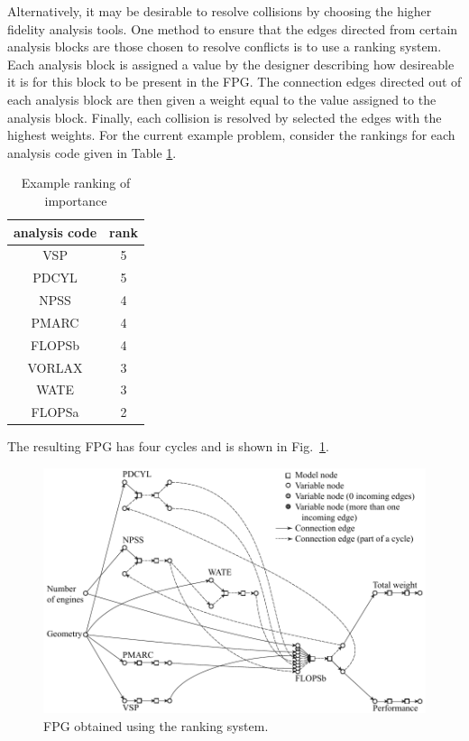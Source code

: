 	Alternatively, it may be desirable to resolve collisions by choosing the higher fidelity analysis tools.
	One method to ensure that the edges directed from certain analysis blocks are those chosen to resolve conflicts is to use a ranking system. Each analysis block is assigned a value by the designer describing how desireable it is for this block to be present in the FPG. The connection edges directed out of each analysis block are then given a weight equal to the value assigned to the analysis block. Finally, each collision is resolved by selected the edges with the highest weights.
For the current example problem, consider the rankings for each analysis code given in Table \ref{t:rankings}.
	\begin{table}[htbp]
	  \centering
	  \caption{Example ranking of importance}
		\begin{tabular}{cc}
		\toprule
		analysis code & rank \\
		\midrule
		VSP   & 5 \\
		PDCYL & 5 \\
		NPSS  & 4 \\
		PMARC & 4 \\
		FLOPSb & 4 \\
		VORLAX & 3 \\
		WATE  & 3 \\
		FLOPSa & 2 \\
		\bottomrule
		\end{tabular}%
	  \label{t:rankings}%
	\end{table}%
	The resulting FPG has four cycles and is shown in Fig.~\ref{f:FPG highest rank}. 
	\begin{figure}[htb!]
	  \begin{center}
		\includegraphics[width=4.5in]{images/FPG_edit_ranking}
	  \end{center}
	  \caption{FPG obtained using the ranking system.}
	\label{f:FPG highest rank}
	\end{figure}
